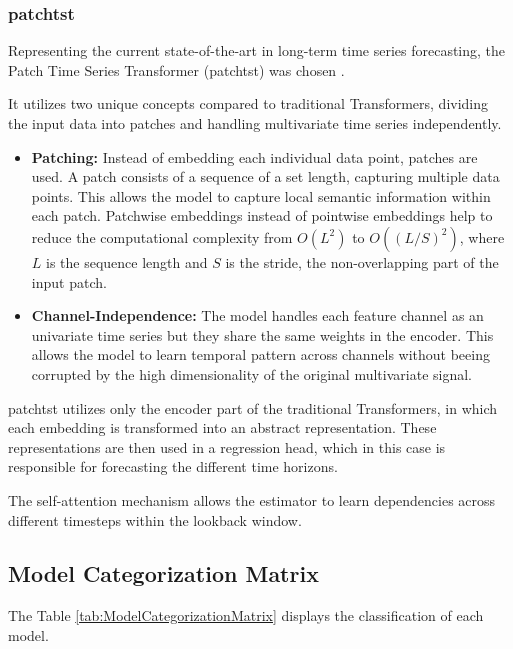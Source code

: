 \documentclass[12pt,twoside=false,a4paper,parskip]{scrbook}
\begin{document}
\subsubsection{\gls{patchtst}}
Representing the current state-of-the-art in long-term time series forecasting, the Patch Time Series Transformer (\gls{patchtst}) was chosen \cite{nie2023timeseriesworth64}.

It utilizes two unique concepts compared to traditional Transformers, dividing the input data into patches and handling multivariate time series independently. 

\begin{itemize}
    \item \textbf{Patching:} Instead of embedding each individual data point, patches are used. A patch consists of a sequence of a set length, capturing multiple data points. This allows the model to capture local semantic information within each patch. 
    Patchwise embeddings instead of pointwise embeddings help to reduce the computational complexity from $O(L^2)$ to $O((L/S)^2)$, where $L$ is the sequence length and $S$ is the stride, the non-overlapping part of the input patch. 
    
    \item \textbf{Channel-Independence:} The model handles each feature channel as an univariate time series but they share the same weights in the encoder. This allows the model to learn temporal pattern across channels without beeing corrupted by the high dimensionality of the original multivariate signal. 

\end{itemize}

\gls{patchtst} utilizes only the encoder part of the traditional Transformers, in which each embedding is transformed into an abstract representation. These representations are then used in a regression head, which in this case is responsible for forecasting the different time horizons. 

The self-attention mechanism allows the estimator to learn dependencies across different timesteps within the lookback window.



\subsection{Model Categorization Matrix}
The Table \ref{tab:ModelCategorizationMatrix} displays the classification of each model.
\end{document}
